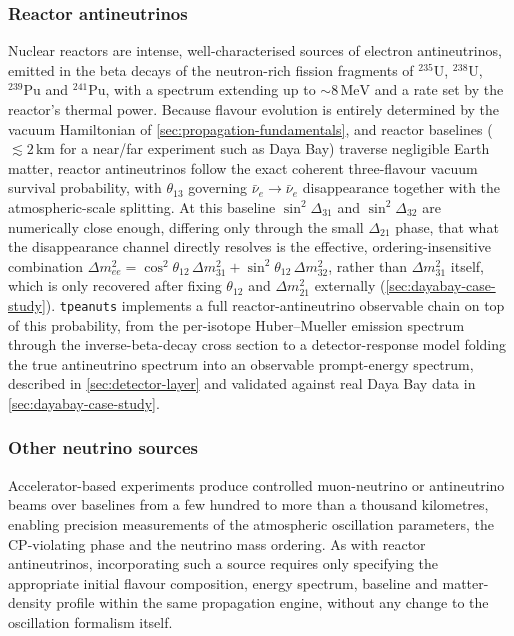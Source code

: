 \subsubsection{Reactor antineutrinos}
\label{sec:reactor-source}

Nuclear reactors are intense, well-characterised sources of electron antineutrinos, emitted in the beta decays of the neutron-rich fission fragments of \(^{235}\mathrm{U}\), \(^{238}\mathrm{U}\), \(^{239}\mathrm{Pu}\) and \(^{241}\mathrm{Pu}\), with a spectrum extending up to \(\sim8\,\mathrm{MeV}\) and a rate set by the reactor's thermal power. Because flavour evolution is entirely determined by the vacuum Hamiltonian of \cref{sec:propagation-fundamentals}, and reactor baselines (\(\lesssim2\,\mathrm{km}\) for a near/far experiment such as Daya Bay) traverse negligible Earth matter, reactor antineutrinos follow the exact coherent three-flavour vacuum survival probability, with \(\theta_{13}\) governing \(\bar\nu_e\to\bar\nu_e\) disappearance together with the atmospheric-scale splitting. At this baseline \(\sin^2\Delta_{31}\) and \(\sin^2\Delta_{32}\) are numerically close enough, differing only through the small \(\Delta_{21}\) phase, that what the disappearance channel directly resolves is the effective, ordering-insensitive combination \(\Delta m^2_{ee}=\cos^2\theta_{12}\,\Delta m^2_{31}+\sin^2\theta_{12}\,\Delta m^2_{32}\), rather than \(\Delta m^2_{31}\) itself, which is only recovered after fixing \(\theta_{12}\) and \(\Delta m^2_{21}\) externally (\cref{sec:dayabay-case-study}). \texttt{tpeanuts} implements a full reactor-antineutrino observable chain on top of this probability, from the per-isotope Huber--Mueller emission spectrum \parencite{Huber2011,Mueller2011} through the inverse-beta-decay cross section \parencite{VogelBeacom1999} to a detector-response model folding the true antineutrino spectrum into an observable prompt-energy spectrum, described in \cref{sec:detector-layer} and validated against real Daya Bay data in \cref{sec:dayabay-case-study}.

\subsubsection{Other neutrino sources}

Accelerator-based experiments produce controlled muon-neutrino or antineutrino beams over baselines from a few hundred to more than a thousand kilometres, enabling precision measurements of the atmospheric oscillation parameters, the CP-violating phase and the neutrino mass ordering. As with reactor antineutrinos, incorporating such a source requires only specifying the appropriate initial flavour composition, energy spectrum, baseline and matter-density profile within the same propagation engine, without any change to the oscillation formalism itself.

